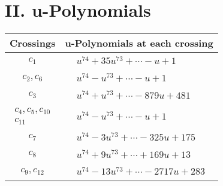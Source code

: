 \documentclass[1p]{elsarticle_modified}
\theoremstyle{definition}
\begin{document}
\newpage\renewcommand{\arraystretch}{1}
\centering \section*{ II. u-Polynomials}
\begin{tabular}{m{50pt}|m{274pt}}
Crossings & \hspace{64pt}u-Polynomials at each crossing \\
\hline $$\begin{aligned}c_{1}\end{aligned}$$&$\begin{aligned}
&u^{74}+35 u^{73}+\cdots- u+1
\end{aligned}$\\
\hline $$\begin{aligned}c_{2},c_{6}\end{aligned}$$&$\begin{aligned}
&u^{74}- u^{73}+\cdots- u+1
\end{aligned}$\\
\hline $$\begin{aligned}c_{3}\end{aligned}$$&$\begin{aligned}
&u^{74}+u^{73}+\cdots-879 u+481
\end{aligned}$\\
\hline $$\begin{aligned}c_{4},c_{5},c_{10}\\c_{11}\end{aligned}$$&$\begin{aligned}
&u^{74}- u^{73}+\cdots- u+1
\end{aligned}$\\
\hline $$\begin{aligned}c_{7}\end{aligned}$$&$\begin{aligned}
&u^{74}-3 u^{73}+\cdots-325 u+175
\end{aligned}$\\
\hline $$\begin{aligned}c_{8}\end{aligned}$$&$\begin{aligned}
&u^{74}+9 u^{73}+\cdots+169 u+13
\end{aligned}$\\
\hline $$\begin{aligned}c_{9},c_{12}\end{aligned}$$&$\begin{aligned}
&u^{74}-13 u^{73}+\cdots-2717 u+283
\end{aligned}$\\
\hline
\end{tabular}\newpage\renewcommand{\arraystretch}{1}
\end{document}

